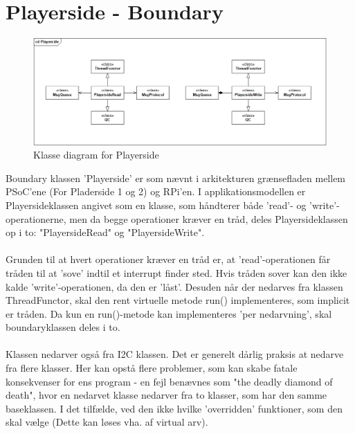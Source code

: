 \documentclass[Softwaredesign/Softwaredesign_main.tex]{subfiles}
\begin{document}
\section{Playerside - Boundary}
\begin{figure}[H]
    \centering
    \includegraphics[width=1\textwidth]{Softwaredesign/RPiApp/graphic_RPi/PS.png}
    \caption{Klasse diagram for Playerside}
   \label{fig:cd_PS}
\end{figure}
Boundary klassen 'Playerside' er som nævnt i arkitekturen grænsefladen mellem PSoC'ene (For Pladerside 1 og 2) og RPi'en. I applikationsmodellen er Playersideklassen angivet som en klasse, som håndterer både 'read'- og 'write'-operationerne, men da begge operationer kræver en tråd, deles Playersideklassen op i to: "PlayersideRead" og "PlayersideWrite". 
\\\\Grunden til at hvert operationer kræver en tråd er, at 'read'-operationen får tråden til at 'sove' indtil et interrupt finder sted. Hvis tråden sover kan den ikke kalde 'write'-operationen, da den er 'låst'. Desuden når der nedarves fra klassen ThreadFunctor, skal den rent virtuelle metode run() implementeres, som implicit er tråden. Da kun en run()-metode kan implementeres 'per nedarvning', skal boundaryklassen deles i to. \\\\
Klassen nedarver også fra I2C klassen. Det er generelt dårlig praksis at nedarve fra flere klasser. Her kan opstå flere problemer, som kan skabe fatale konsekvenser for ens program - en fejl benævnes som "the deadly diamond of death", hvor en nedarvet klasse nedarver fra to klasser, som har den samme baseklassen. I det tilfælde, ved den ikke hvilke 'overridden' funktioner, som den skal vælge (Dette kan løses vha. af virtual arv). 
\end{document}
